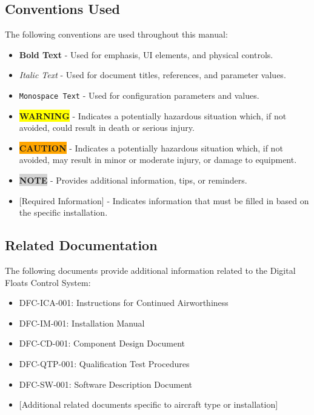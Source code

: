 \documentclass[12pt,a4paper,twoside,openright]{book}
\begin{document}
\subsection{Conventions Used}

The following conventions are used throughout this manual:

\begin{itemize}
    \item \textbf{Bold Text} - Used for emphasis, UI elements, and physical controls.
    \item \textit{Italic Text} - Used for document titles, references, and parameter values.
    \item \texttt{Monospace Text} - Used for configuration parameters and values.
    \item \colorbox{yellow}{\textbf{WARNING}} - Indicates a potentially hazardous situation which, if not avoided, could result in death or serious injury.
    \item \colorbox{orange}{\textbf{CAUTION}} - Indicates a potentially hazardous situation which, if not avoided, may result in minor or moderate injury, or damage to equipment.
    \item \colorbox{lightgray}{\textbf{NOTE}} - Provides additional information, tips, or reminders.
    \item {\color{missingred}[Required Information]} - Indicates information that must be filled in based on the specific installation.
\end{itemize}

\subsection{Related Documentation}

The following documents provide additional information related to the Digital Floats Control System:

\begin{itemize}
    \item DFC-ICA-001: Instructions for Continued Airworthiness
    \item DFC-IM-001: Installation Manual
    \item DFC-CD-001: Component Design Document
    \item DFC-QTP-001: Qualification Test Procedures
    \item DFC-SW-001: Software Description Document
    \item {\color{missingred}[Additional related documents specific to aircraft type or installation]}
\end{itemize}
\end{document}

